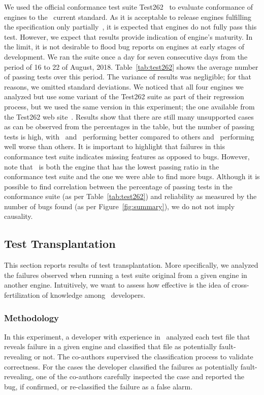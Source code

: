 \documentclass[10pt,conference,anonymous]{IEEEtran}
\begin{document}
We used the official conformance test suite
Test262~\cite{ecma262-conformance-suite} to evaluate conformance of
engines to the \js\ current standard. As it is acceptable to release
engines fulfilling the specification only partially~\cite{kangax}, it
is expected that engines do not fully pass this test. However, we
expect that results provide indication of engine's maturity. In the
limit, it is not desirable to flood bug reports on engines at early
stages of development. We ran the suite once a day for seven
consecutive days from the period of 16 to 22 of August,
2018. Table~\ref{tab:test262} shows the average number of passing
tests over this period. The variance of results was negligible; for
that reasons, we omitted standard deviations. We noticed that all four
engines we analyzed but \chakra{} use some variant of the Test262
suite as part of their regression process, but we used the same
version in this experiment; the one available from the Test262 web
site~\cite{ecma262-conformance-suite}. Results show that there are
still many unsupported cases as can be observed from the percentages
in the table, but the number of passing tests is high, with
\veight\ and \smonkey\ performing better compared to others and
\chakra\ performing well worse than others. It is important to
highlight that failures in this conformance test suite indicates
missing features as opposed to bugs. However, note that \chakra\ is
both the engine that has the lowest passing ratio in the conformance
test suite and the one we were able to find more bugs. Although it is
possible to find correlation between the percentage of passing tests
in the conformance suite (as per Table~\ref{tab:test262}) and reliability as
measured by the number of bugs found (as per
Figure~\ref{fig:summary}), we do not not imply causality.


\subsection{Test Transplantation}
\label{sec:transplantation}

This section reports results of test transplantation. More
specifically, we analyzed the failures observed when running a test
suite original from a given engine in another engine. Intuitively, we
want to assess how effective is the idea of cross-fertilization of
knowledge among \js\ developers.

\vspace{0.5ex}
\subsubsection{Methodology}
\label{sec:methodology}
In this experiment, a developer with experience in \js\ analyzed each
test file that reveals failure in a given engine and classified that
file as potentially fault-revealing or not. The co-authors supervised
the classification process to validate correctness. For the cases the
developer classified the failures as potentially fault-revealing, one
of the co-authors carefully inspected the case and reported the bug,
if confirmed, or re-classified the failure as a false alarm.
\end{document}
